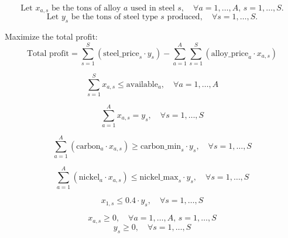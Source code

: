 \documentclass{article}
\begin{document}
\[
\text{Let } x_{a,s} \text{ be the tons of alloy } a \text{ used in steel } s, \quad \forall a = 1, \ldots, A, \, s = 1, \ldots, S.
\]
\[
\text{Let } y_s \text{ be the tons of steel type } s \text{ produced}, \quad \forall s = 1, \ldots, S.
\]

Maximize the total profit:
\[
\text{Total profit} = \sum_{s=1}^{S} \left( \text{steel\_price}_s \cdot y_s \right) - \sum_{a=1}^{A} \sum_{s=1}^{S} \left( \text{alloy\_price}_a \cdot x_{a,s} \right)
\]


\[
\sum_{s=1}^{S} x_{a,s} \leq \text{available}_a, \quad \forall a = 1, \ldots, A
\]

\[
\sum_{a=1}^{A} x_{a,s} = y_s, \quad \forall s = 1, \ldots, S
\]

\[
\sum_{a=1}^{A} \left( \text{carbon}_a \cdot x_{a,s} \right) \geq \text{carbon\_min}_s \cdot y_s, \quad \forall s = 1, \ldots, S
\]

\[
\sum_{a=1}^{A} \left( \text{nickel}_a \cdot x_{a,s} \right) \leq \text{nickel\_max}_s \cdot y_s, \quad \forall s = 1, \ldots, S
\]

\[
x_{1,s} \leq 0.4 \cdot y_s, \quad \forall s = 1, \ldots, S
\]

\[
x_{a,s} \geq 0, \quad \forall a = 1, \ldots, A, \, s = 1, \ldots, S
\]
\[
y_s \geq 0, \quad \forall s = 1, \ldots, S
\]
\end{document}
